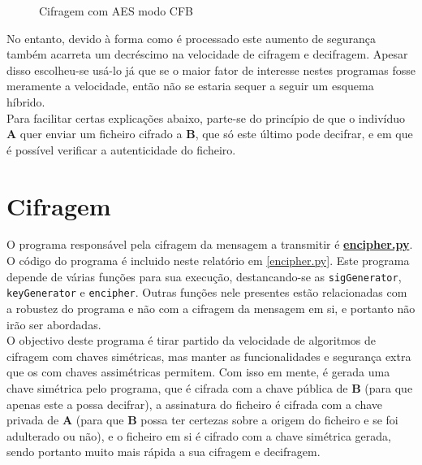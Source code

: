 \documentclass[a4paper,11pt,openright,oneside]{report}
\begin{document}
\begin{figure}[ht]
\center
{}
\caption{Cifragem com AES modo CFB}
\label{fig:crypto6}
\end{figure}

No entanto, devido à forma como é processado este aumento de segurança também acarreta um decréscimo na velocidade de cifragem e decifragem. Apesar disso escolheu-se usá-lo já que se o maior fator de interesse nestes programas fosse meramente a velocidade, então não se estaria sequer a seguir um esquema híbrido.\\

Para facilitar certas explicações abaixo, parte-se do princípio de que o indivíduo \textbf{A} quer enviar um ficheiro cifrado a \textbf{B}, que só este último pode decifrar, e em que é possível verificar a autenticidade do ficheiro.

\section{Cifragem}

O programa responsável pela cifragem da mensagem a transmitir é \href{run:../Python/Sender/encipher.py}{\textbf{encipher.py}}. O código do programa é incluido neste relatório em \ref{encipher.py}.
Este programa depende de várias funções para sua execução, destancando-se as \verb|sigGenerator|, \verb|keyGenerator| e \verb|encipher|. Outras funções nele presentes estão relacionadas com a robustez do programa e não com a cifragem da mensagem em si, e portanto não irão ser abordadas.\\

O objectivo deste programa é tirar partido da velocidade de algoritmos de cifragem com chaves simétricas, mas manter as funcionalidades e segurança extra que os com chaves assimétricas permitem. Com isso em mente, é gerada uma chave simétrica pelo programa, que é cifrada com a chave pública de \textbf{B} (para que apenas este a possa decifrar), a assinatura do ficheiro é cifrada com a chave privada de \textbf{A} (para que \textbf{B} possa ter certezas sobre a origem do ficheiro e se foi adulterado ou não), e o ficheiro em si é cifrado com a chave simétrica gerada, sendo portanto muito mais rápida a sua cifragem e decifragem.\\
\end{document}
